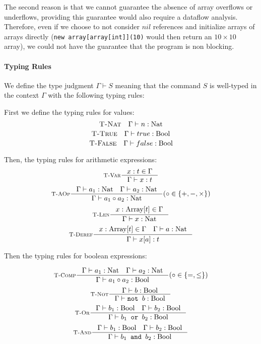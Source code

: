 \documentclass{article}
\begin{document}
The second reason is that we cannot guarantee the absence of  array overflows or underflows, providing this guarantee would also require a dataflow analysis.
Therefore, even if we choose to not consider \(nil\) references and initialize arrays of arrays directly (\texttt{new array[array[int]](10)} would then return an \(10 \times 10\) array), we could not have the guarantee that the program is non blocking.

\paragraph{Typing Rules}
We define the type judgment \(\Gamma \vdash S\) meaning that the command \(S\) is well-typed in the context \(\Gamma\) with the following typing rules:

First we define the typing rules for values:
\[
\textsc{T-Nat} \quad \Gamma \vdash n : \text{Nat}
\]
\[
\textsc{T-True} \quad \Gamma \vdash true : \text{Bool}
\]
\[
\textsc{T-False} \quad \Gamma \vdash false : \text{Bool} 
\]

Then, the typing rules for arithmetic expressions:
\[
\inference[\textsc{T-Var}]
    {x : t \in \Gamma}
    {\Gamma \vdash x : t}{}
\]
\[
\inference[\textsc{T-AOp}]
    {\Gamma \vdash a_1 : \text{Nat} \quad \Gamma \vdash a_2 : \text{Nat}}
    {\Gamma \vdash a_1 \circ a_2 : \text{Nat}}{(\circ \in \{+, -,\times\})}
\]
\[
\inference[\textsc{T-Len}]
    {x : \text{Array}[t] \in \Gamma}
    {\Gamma \vdash x : \text{Nat}}{}
\]
\[
\inference[\textsc{T-Deref}]
    {x : \text{Array}[t] \in \Gamma \quad \Gamma \vdash a : \text{Nat}}
    {\Gamma \vdash  x[a] : t}{}
\]

Then the typing rules for boolean expressions:

\[
\inference[\textsc{T-Comp}]
    {\Gamma \vdash a_1 : \text{Nat} \quad \Gamma \vdash a_2 : \text{Nat}}
    {\Gamma \vdash a_1 \circ a_2 : \text{Bool}}{(\circ \in \{=, \leq\})}
\]
\[
\inference[\textsc{T-Not}]
    {\Gamma \vdash b : \text{Bool}}
    {\Gamma \vdash \texttt{not } b : \text{Bool}}{}
\]
\[
\inference[\textsc{T-Or}]
    {\Gamma \vdash b_1 : \text{Bool} \quad \Gamma \vdash b_2 : \text{Bool}}
    {\Gamma \vdash  b_1 \texttt{ or } b_2 : \text{Bool}}{}
\]
\[
\inference[\textsc{T-And}]
    {\Gamma \vdash b_1 : \text{Bool} \quad \Gamma \vdash b_2 : \text{Bool}}
    {\Gamma \vdash  b_1 \texttt{ and } b_2 : \text{Bool}}{}
\]
\end{document}

